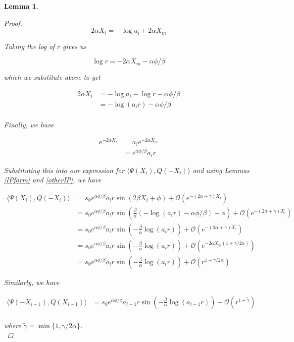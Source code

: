 \documentclass[12pt]{article}
\newtheorem{lemma}{Lemma}
\begin{document}
\begin{lemma}
\begin{proof}
\[
2 \alpha X_i = -\log a_i + 2 \alpha X_m
\]

Taking the log of $r$ gives us

\[
\log r = -2 \alpha X_m - \alpha \phi / \beta
\]

which we substitute above to get

\begin{align*}
2 \alpha X_i &= -\log a_i - \log r - \alpha \phi / \beta \\
&= -\log (a_i r) - \alpha \phi / \beta \\
\end{align*}

Finally, we have

\begin{align*}
e^{-2 \alpha X_i} &= a_i e^{-2 \alpha X_m} \\
&= e^{\alpha \phi / \beta } a_i r
\end{align*}

Substituting this into our expression for $\langle \Psi(X_i), Q(-X_i) \rangle$ and using Lemmas \ref{IPform} and \ref{otherIP}, we have

\begin{align*}
\langle \Psi(X_i), Q(-X_i) \rangle 
&= s_0 e^{\alpha \phi / \beta } a_i r \sin \left( 2 \beta X_i  + \phi \right) + \mathcal{O}(e^{-(2 \alpha + \gamma) X_i}) \\
&= s_0 e^{\alpha \phi / \beta } a_i r \sin \left( \frac{\beta}{\alpha} ( -\log (a_i r) - \alpha \phi / \beta ) + \phi \right) + \mathcal{O}(e^{-(2 \alpha + \gamma) X_i}) \\
&= s_0 e^{\alpha \phi / \beta } a_i r \sin \left( - \frac{\beta}{\alpha} \log (a_i r) \right) + \mathcal{O}(e^{-(2 \alpha + \gamma) X_i}) \\
&= s_0 e^{\alpha \phi / \beta } a_i r \sin \left( - \frac{\beta}{\alpha} \log (a_i r) \right) + \mathcal{O}(e^{-2 \alpha X_m (1 + \gamma / 2 \alpha)}) \\
&= s_0 e^{\alpha \phi / \beta } a_i r \sin \left( - \frac{\beta}{\alpha} \log (a_i r) \right) + \mathcal{O}(r^{1 + \gamma / 2 \alpha})
\end{align*}

Similarly, we have

\begin{align*}
\langle \Psi(-X_{i-1}), Q(X_{i-1}) \rangle 
&= s_0 e^{\alpha \phi / \beta } a_{i-1} r \sin \left( - \frac{\beta}{\alpha} \log (a_{i-1} r) \right) + \mathcal{O}(r^{1 + \tilde{\gamma}}) \\
\end{align*}

where $\tilde{\gamma} = \min\{ 1, \gamma / 2 \alpha \}$. \\


\end{proof} 
\end{lemma}
\end{document}
